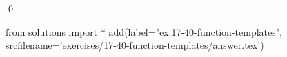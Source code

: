 
\begin{ex}
  \label{ex:17-40-function-templates}
  
  \qed
\end{ex}
\begin{python0}
from solutions import *
add(label="ex:17-40-function-templates",
    srcfilename='exercises/17-40-function-templates/answer.tex')
\end{python0}
